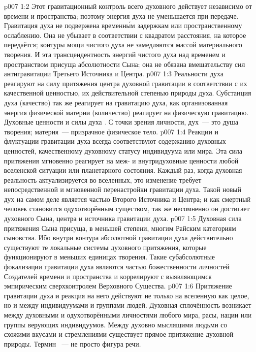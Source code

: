 \vs p007 1:2 Этот гравитационный контроль всего духовного действует независимо от времени и пространства; поэтому энергия духа не уменьшается при передаче. Гравитация духа не подвержена временн\'ым задержкам или пространственному ослаблению. Она не убывает в соответствии с квадратом расстояния, на которое передаётся; контуры мощи чистого духа не замедляются массой материального творения. И эта трансцендентность энергий чистого духа над временем и пространством присуща абсолютности Сына; она не обязана вмешательству сил антигравитации Третьего Источника и Центра.
\vs p007 1:3 Реальности духа реагируют на силу притяжения центра духовной гравитации в соответствии с их качественной ценностью, их действительной степенью природы духа. Субстанция духа (качество) так же реагирует на гравитацию духа, как организованная энергия физической материи (количество) реагирует на физическую гравитацию. Духовные ценности и силы духа . С точки зрения личности, дух~--- это душа творения; материя~--- призрачное физическое тело.
\vs p007 1:4 Реакции и флуктуации гравитации духа всегда соответствуют содержанию духовных ценностей, качественному духовному статусу индивидуума или мира. Эта сила притяжения мгновенно реагирует на меж\hyp{} и внутридуховные ценности любой вселенской ситуации или планетарного состояния. Каждый раз, когда духовная реальность актуализируется во вселенных, это изменение требует непосредственной и мгновенной перенастройки гравитации духа. Такой новый дух на самом деле является частью Второго Источника и Центра; и как смертный человек становится одухотворённым существом, так же несомненно он достигает духовного Сына, центра и источника гравитации духа.
\vs p007 1:5 \pc Духовная сила притяжения Сына присуща, в меньшей степени, многим Райским категориям сыновства. Ибо внутри контура абсолютной гравитации духа действительно существуют те локальные системы духовного притяжения, которые функционируют в меньших единицах творения. Такие субабсолютные фокализации гравитации духа являются частью божественности личностей Создателей времени и пространства и коррелируют с выявляющимся эмпирическим сверхконтролем Верховного Существа.
\vs p007 1:6 Притяжение гравитации духа и реакция на него действуют не только на вселенную как целое, но и между индивидуумами и группами людей. Духовная сплочённость возникает между духовными и одухотворёнными личностями любого мира, расы, нации или группы верующих индивидуумов. Между духовно мыслящими людьми со схожими вкусами и стремлениями существует прямое притяжение духовной природы. Термин ~--- не просто фигура речи.

